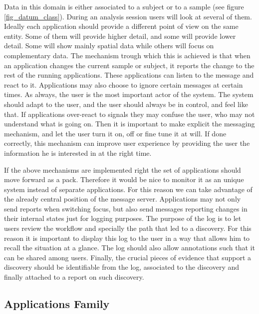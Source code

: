 Data in this domain is either associated to a subject or to a sample (see figure \ref{fig_datum_class}). During an analysis session users will look at several of them. Ideally each application should provide a different point of view on the same entity. Some of them will provide higher detail, and some will provide lower detail. Some will show mainly spatial data while others will focus on complementary data. The mechanism trough which this is achieved is that when an application changes the current sample or subject, it reports the change to the rest of the running applications. These applications can listen to the message and react to it. Applications may also choose to ignore certain messages at certain times. As always, the user is the most important actor of the system. The system should adapt to the user, and the user should always be in control, and feel like that. If applications over-react to signals they may confuse the user, who may not understand what is going on. Then it is important to make explicit the messaging mechanism, and let the user turn it on, off or fine tune it at will. If done correctly, this mechanism can improve user experience by providing the user the information he is interested in at the right time.

If the above mechanisms are implemented right the set of applications should move forward as a pack. Therefore it would be nice to monitor it as an unique system instead of separate applications. For this reason we can take advantage of the already central position of the message server. Applications may not only send reports when switching focus, but also send messages reporting changes in their internal states just for logging purposes. The purpose of the log is to let users review the workflow and specially the path that led to a discovery. For this reason it is important to display this log to the user in a way that allows him to recall the situation at a glance. The log should also allow annotations such that it can be shared among users. Finally, the crucial pieces of evidence that support a discovery should be identifiable from the log, associated to the discovery and finally attached to a report on such discovery.



%


\subsection{Applications Family}

